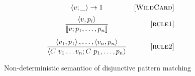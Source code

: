 \documentclass[a5paper,12pt]{article}
\newcommand{\inbr}[1]{\left<{#1}\right>}
\newcommand{\ruleno}[1]{\mbox{[\textsc{#1}]}}
\newcommand{\bigslant}[2]{{\raisebox{.2em}{$#1$}\left/\raisebox{-.2em}{$#2$}\right.}}
\newcommand{\sem}[1]{\llbracket #1 \rrbracket}
\begin{document}
\begin{figure}
  \[
  \begin{array}{cr}
    \inbr{v; \_} \rightarrow 1 & \ruleno{WildCard}\\[2mm]
    \dfrac{\inbr{v,p_i}}{\sem{v;p_1,\dots, p_n}} & \ruleno{rule1}\\[5mm]
    \dfrac{\inbr{v_1,p_1},\dots,\inbr{v_n,p_n}}{\inbr{C\ v_1\dots v_n; C\ p_1,\dots, p_n}} & \ruleno{rule2}
  \end{array}
  \]
  \caption{Non-deterministic semantioc of disjunctive pattern matching}
\end{figure}
\end{document}
